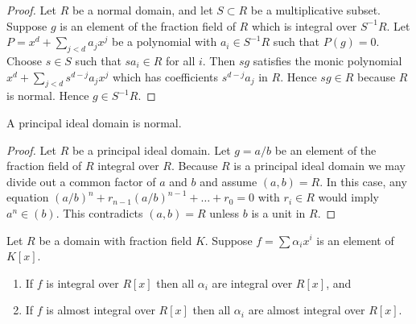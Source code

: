 \begin{proof}
Let $R$ be a normal domain, and let $S \subset R$ be
a multiplicative subset. Suppose $g$ is an element
of the fraction field of $R$ which is integral over $S^{-1}R$.
Let $P = x^d + \sum_{j < d} a_j x^j$ be a polynomial
with $a_i \in S^{-1}R$ such that $P(g) = 0$.
Choose $s \in S$ such that $sa_i \in R$ for all $i$.
Then $sg$ satisfies the monic polynomial
$x^d + \sum_{j < d} s^{d-j}a_j x^j$ which has coefficients
$s^{d-j}a_j$ in $R$. Hence $sg \in R$ because $R$ is normal.
Hence $g \in S^{-1}R$.
\end{proof}

\begin{lemma}
\label{lemma-PID-normal}
A principal ideal domain is normal.
\end{lemma}

\begin{proof}
Let $R$ be a principal ideal domain.
Let $g = a/b$ be an element of the fraction field
of $R$ integral over $R$. Because $R$ is a principal ideal domain
we may divide out a common factor of $a$ and $b$
and assume $(a, b) = R$. In this case, any equation
$(a/b)^n + r_{n-1} (a/b)^{n-1} + \ldots + r_0 = 0$
with $r_i \in R$ would imply $a^n \in (b)$. This
contradicts $(a, b) = R$ unless $b$ is a unit in $R$.
\end{proof}

\begin{lemma}
\label{lemma-prepare-polynomial-ring-normal}
Let $R$ be a domain with fraction field $K$.
Suppose $f = \sum \alpha_i x^i$ is an
element of $K[x]$.
\begin{enumerate}
\item If $f$ is integral over $R[x]$
then all $\alpha_i$ are integral over $R[x]$, and
\item If $f$ is almost integral over $R[x]$
then all $\alpha_i$ are almost integral over $R[x]$.
\end{enumerate}
\end{lemma}

